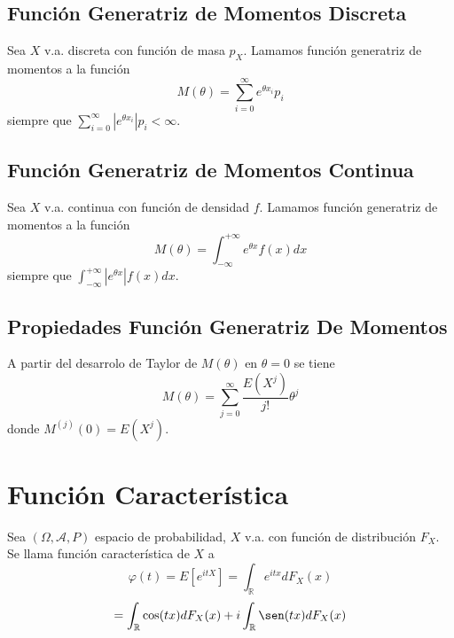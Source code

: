 \subsection{Función Generatriz de Momentos Discreta}

\begin{defn}
  Sea $X$ v.a. discreta con función de masa $p_{X}$. Lamamos función generatriz de momentos a la función
  \[ 
    M(\theta) = \sum_{i = 0}^{\infty} e ^{\theta x_{i}} p_{i} 
  \] 
  siempre que $\sum_{i = 0}^{\infty} |e ^{\theta x_{i}}| p_{i} < \infty$.
\end{defn}

\subsection{Función Generatriz de Momentos Continua}

\begin{defn}
  Sea $X$ v.a. continua con función de densidad $f$. Lamamos función generatriz de momentos a la función
  \[ 
    M(\theta) = \int_{-\infty}^{+\infty} e ^{\theta x} f(x) dx
  \] 
  siempre que $\int_{-\infty}^{+\infty} |e ^{\theta x}| f(x) dx$.
\end{defn}

\subsection{Propiedades Función Generatriz De Momentos}

\begin{prop}
  A partir del desarrolo de Taylor de $M(\theta)$ en $\theta = 0$ se tiene
  \[ 
    M(\theta) = \sum_{j = 0}^{\infty} \frac{E(X^{j})}{j!}\theta^{j} 
  \] 
  donde $M^{(j)}(0) = E(X^{j})$.
\end{prop}

\section{Función Característica}

\begin{defn}
  Sea $(\Omega, \mathcal{A}, P )$ espacio de probabilidad, $X$ v.a. con función de distribución $F_{X}$. Se llama función característica de $X$ a
  \[ 
    \varphi(t) = E [e^{itX}] = \int_{\mathbb{R}}^{} e^{itx} dF_{X}(x)
  \] 
  \[ 
    = \int_{\mathbb{R}}^{} \cos(tx) dF_{X}(x) + i \int_{\mathbb{R}}^{} \sen(tx) dF_{X}(x)
  \] 
\end{defn}


